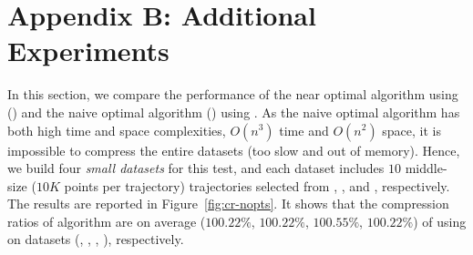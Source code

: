 \vspace{-1ex}
\section*{Appendix B: Additional Experiments}
\label{sec-app-exp}


In this section, we compare the performance of the near optimal algorithm using \sed (\nopts) and the naive optimal algorithm (\opt) using \sed.
As the naive optimal algorithm has both high time and space complexities, \ie $O(n^3)$ time and $O(n^2)$ space, it is impossible to compress the entire datasets (too slow and out of memory). Hence, we build four \textit{small datasets} for this test, and each dataset includes $10$ middle-size ($10K$ points per trajectory) trajectories selected from \ucar, \geolife, \mopsi and \act, respectively.
The results are reported in Figure~\ref{fig:cr-nopts}. It shows that the
compression ratios of algorithm \nopts are on average ($100.22\%$, $100.22\%$,
$100.55\%$, $100.22\%$) of \opt using \sed on datasets (\ucar, \geolife, \mopsi, \act), respectively.

